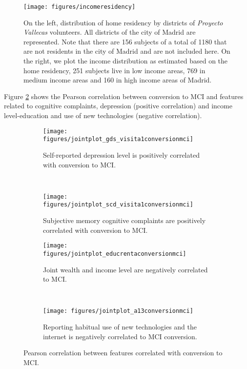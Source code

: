 \documentclass[11pt]{article}
\begin{document}
\begin{figure}[H]
        \centering
        \texttt{[image: figures/incomeresidency]}
        \caption{On the left, distribution of home residency by districts of \emph{Proyecto Vallecas} volunteers. All districts of the city of Madrid are represented. Note that there are 156 subjects of a total of 1180 that are not residents in the city of Madrid and are not included here. On the right, we plot the income distribution as estimated based on the home residency, 251 subjects live in low income areas, 769 in medium income areas and 160 in high income areas of Madrid.
        }
\label{fig:incomeresidency}
\end{figure}

Figure \ref{fig:multico} shows the Pearson correlation between conversion to MCI and features related to cognitive complaints, depression (positive correlation) and income level-education and use of new technologies (negative correlation).

\begin{figure}[H]
    \centering
    \begin{subfigure}[t]{0.45\textwidth}
        \centering
        \texttt{[image: figures/jointplot\_gds\_visita1conversionmci]}
        \caption{Self-reported depression level is positively correlated with conversion to MCI.}
    \end{subfigure}
    ~ 
    \begin{subfigure}[t]{0.45\textwidth}
        \centering
        \texttt{[image: figures/jointplot\_scd\_visita1conversionmci]}
        \caption{Subjective memory cognitive complaints are positively correlated with conversion to MCI.}
    \end{subfigure}%
    
     \begin{subfigure}[t]{0.45\textwidth}
        \centering
        \texttt{[image: figures/jointplot\_educrentaconversionmci]}
        \caption{Joint wealth and income level are negatively correlated to MCI.}
    \end{subfigure}
    ~ 
    \begin{subfigure}[t]{0.45\textwidth}
        \centering
        \texttt{[image: figures/jointplot\_a13conversionmci]}
        \caption{Reporting habitual use of new technologies and the internet is negatively correlated to MCI conversion.}
    \end{subfigure}%
    \label{fig:multico}
    \caption{Pearson correlation between features correlated with conversion to MCI.}
\end{figure}
\end{document}
